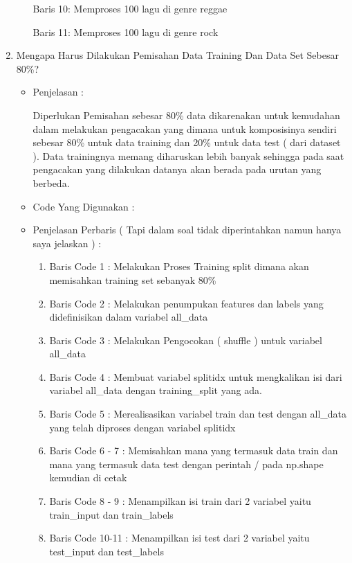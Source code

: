 \begin{enumerate}
\begin{itemize}
\par Baris 10: Memproses 100 lagu di genre reggae
\par Baris 11: Memproses 100 lagu di genre rock
\end{itemize}
\par
\par
\item Mengapa Harus Dilakukan Pemisahan Data Training Dan Data Set Sebesar 80\%?
\begin{itemize}
\item Penjelasan :
\par Diperlukan Pemisahan sebesar 80\% data dikarenakan untuk kemudahan dalam melakukan pengacakan yang dimana untuk komposisinya sendiri sebesar 80\% untuk data training dan 20\% untuk data test ( dari dataset ). Data trainingnya memang diharuskan lebih banyak sehingga pada saat pengacakan yang dilakukan datanya akan berada pada urutan yang berbeda.
\item Code Yang Digunakan :
\par 
\par

\par
\par
\item Penjelasan Perbaris ( Tapi dalam soal tidak diperintahkan namun hanya saya jelaskan ) :
\begin{enumerate}
\item Baris Code 1 : Melakukan Proses Training split dimana akan memisahkan training set sebanyak 80\%
\item Baris Code 2 : Melakukan penumpukan features dan labels yang didefinisikan dalam variabel all\_data
\item Baris Code 3 : Melakukan Pengocokan ( shuffle ) untuk variabel all\_data 
\item Baris Code 4 : Membuat variabel splitidx untuk mengkalikan isi dari variabel all\_data dengan training\_split yang ada.
\item Baris Code 5 : Merealisasikan variabel train dan test dengan all\_data yang telah diproses dengan variabel splitidx
\item Baris Code 6 - 7 : Memisahkan mana yang termasuk data train dan mana yang termasuk data test dengan perintah / pada np.shape kemudian di cetak
\item Baris Code 8 - 9 : Menampilkan isi train dari 2 variabel yaitu train\_input dan train\_labels
\item Baris Code 10-11 : Menampilkan isi test dari 2 variabel yaitu test\_input dan test\_labels

\end{enumerate}
\end{itemize}
\end{enumerate}
